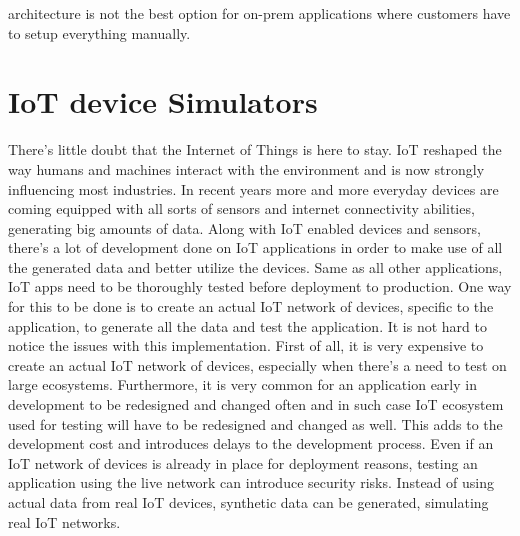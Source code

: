 architecture is not the best option for on-prem applications where customers have to setup everything manually.\cite{whenmicroarebad}

\section{IoT device Simulators}

There's little doubt that the Internet of Things is here to stay. IoT reshaped the way humans and machines interact with the environment and is now strongly influencing most industries. In recent years more and more everyday devices are coming equipped with all sorts of sensors and internet connectivity abilities, generating big amounts of data. Along with IoT enabled devices and sensors, there's a lot of development done on IoT applications in order to make use of all the generated data and better utilize the devices. Same as all other applications, IoT apps need to be thoroughly tested before deployment to production. One way for this to be done is to create an actual IoT network of devices, specific to the application, to generate all the data and test the application. It is not hard to notice the issues with this implementation. First of all, it is very expensive to create an actual IoT network of devices, especially when there's a need to test on large ecosystems. Furthermore, it is very common for an application early in development to be redesigned and changed often and in such case IoT ecosystem used for testing will have to be redesigned and changed as well. This adds to the development cost and introduces delays to the development process. Even if an IoT network of devices is already in place for deployment reasons, testing an application using the live network can introduce security risks. Instead of using actual data from real IoT devices, synthetic data can be generated, simulating real IoT networks. 


